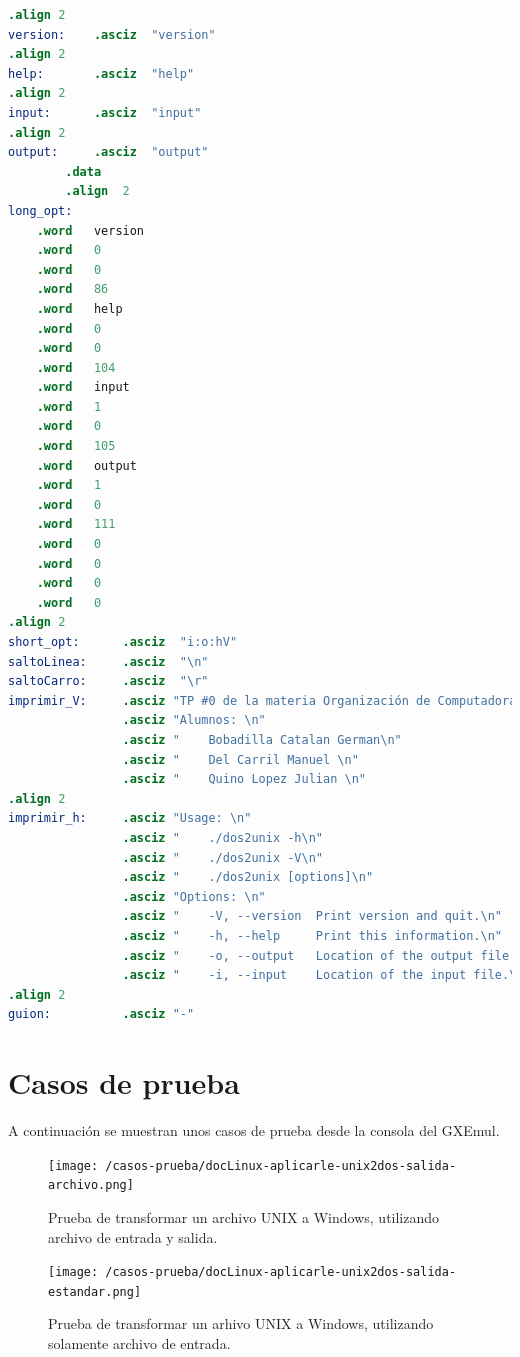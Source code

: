 \documentclass[a4paper]{article}
\begin{document}
\begin{lstlisting}[language=Assembler]
.align 2
version:	.asciz  "version"
.align 2
help:		.asciz  "help"
.align 2
input:		.asciz  "input"
.align 2
output:		.asciz  "output"
        .data
        .align  2
long_opt:
    .word   version
    .word   0
    .word   0
    .word   86
    .word   help
    .word   0
    .word   0
    .word   104
    .word   input
    .word   1
    .word   0
    .word   105
    .word   output
    .word   1
    .word   0
    .word   111
    .word   0
    .word   0
    .word   0
    .word   0
.align 2
short_opt:		.asciz  "i:o:hV"
saltoLinea:    	.asciz  "\n"
saltoCarro:    	.asciz  "\r"
imprimir_V:		.asciz "TP #0 de la materia Organización de Computadoras \n"
				.asciz "Alumnos: \n"
				.asciz "	Bobadilla Catalan German\n"
				.asciz "	Del Carril Manuel \n"
				.asciz "	Quino Lopez Julian \n"
.align 2
imprimir_h:		.asciz "Usage: \n"
	            .asciz "	./dos2unix -h\n"
	            .asciz "	./dos2unix -V\n"
	            .asciz "	./dos2unix [options]\n"
	            .asciz "Options: \n"
	            .asciz "	-V, --version  Print version and quit.\n"
	            .asciz "	-h, --help     Print this information.\n"
	            .asciz "	-o, --output   Location of the output file.\n"
	            .asciz "	-i, --input    Location of the input file.\n"
.align 2
guion:			.asciz "-"

\end{lstlisting}

\section{Casos de prueba}

A continuación se muestran unos casos de prueba desde la consola del GXEmul.


\begin{figure}[!htp]
\begin{center}
\texttt{[image: /casos-prueba/docLinux-aplicarle-unix2dos-salida-archivo.png]}
\caption{Prueba de transformar un archivo UNIX a Windows, utilizando archivo de entrada y salida.} \label{fig001}
\end{center}
\end{figure}

\begin{figure}[!htp]
\begin{center}
\texttt{[image: /casos-prueba/docLinux-aplicarle-unix2dos-salida-estandar.png]}
\caption{Prueba de transformar un arhivo UNIX a Windows, utilizando solamente archivo de entrada.} \label{fig001}
\end{center}
\end{figure}
\end{document}
